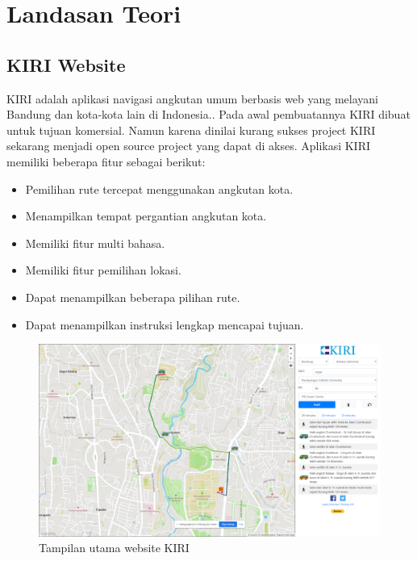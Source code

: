 \chapter{Landasan Teori}
\label{chap:teori}

\section{KIRI Website }
\label{sec:KIRI} 
KIRI adalah aplikasi navigasi angkutan umum berbasis web yang melayani Bandung dan kota-kota lain di Indonesia.\cite{pascal:17:KIRI}.
Pada awal pembuatannya KIRI dibuat untuk tujuan komersial. Namun karena dinilai kurang sukses project KIRI sekarang menjadi open source project yang dapat di akses. Aplikasi KIRI memiliki beberapa fitur sebagai berikut:
\begin{itemize}
    \item Pemilihan rute tercepat menggunakan angkutan kota.
    \item Menampilkan tempat pergantian angkutan kota.
    \item Memiliki fitur multi bahasa.
    \item Memiliki fitur pemilihan lokasi.
    \item Dapat menampilkan beberapa pilihan rute.
    \item Dapat menampilkan instruksi lengkap  mencapai tujuan.
\end{itemize}

\begin{figure}[H]
    \centering
    \includegraphics[scale=0.3]{Gambar/kiri-example-1}
    \caption{Tampilan utama website KIRI}
    \label{fig:my_label}
\end{figure}




